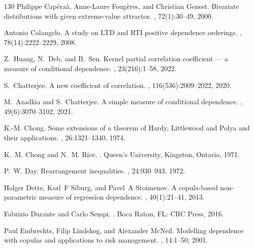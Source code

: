\documentclass{article}
\begin{document}
\begin{thebibliography}{130}
    Philippe Cap{\'e}ra{\`a}, Anne-Laure Foug{\`e}res, and Christian Genest.
    \newblock Bivariate distributions with given extreme-value attractor.
    , 72(1):30--49, 2000.

    Antonio Colangelo.
    \newblock A study on {LTD} and {RTI} positive dependence orderings.
    , 78(14):2222--2229, 2008.

    Z.~Huang, N.~Deb, and B.~Sen.
    \newblock Kernel partial correlation coefficient — a measure of conditional
      dependence.
    , 23(216):1--58, 2022.
    
    S.~Chatterjee.
    \newblock A new coefficient of correlation.
    , 116(536):2009--2022, 2020.

    M.~Azadkia and S.~Chatterjee.
    \newblock A simple measure of conditional dependence.
    , 49(6):3070--3102, 2021.
    
    K.-M. Chong.
    \newblock Some extensions of a theorem of {Hardy}, {Littlewood} and {Polya} and
      their applications.
    , 26:1321--1340, 1974.
    
    K.~M. Chong and N.~M. Rice.
    .
    \newblock Queen's University, Kingston, Ontario, 1971.
    
    P.~W. Day.
    \newblock Rearrangement inequalities.
    , 24:930--943, 1972.
    
    Holger Dette, Karl~F Siburg, and Pavel~A Stoimenov.
    \newblock A copula-based non-parametric measure of regression dependence.
    , 40(1):21--41, 2013.
    
    Fabrizio {Durante} and Carlo {Sempi}.
    .
    \newblock Boca Raton, FL: CRC Press, 2016.
    
    Paul Embrechts, Filip Lindskog, and Alexander McNeil.
    \newblock Modelling dependence with copulas and applications to risk management.
    , 14:1--50, 2001.
          

\end{thebibliography}
\end{document}
